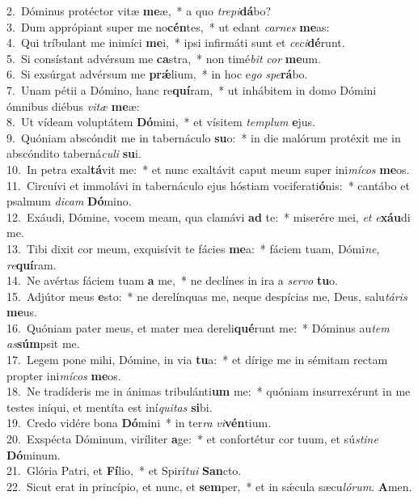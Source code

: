 {2.~}Dóminus protéctor vitæ \textbf{me}æ,~* a quo \textit{tre}\textit{pi}\textbf{dá}bo?\\
{3.~}Dum apprópiant super me no\textbf{cén}tes,~* ut edant \textit{car}\textit{nes} \textbf{me}as:\\
{4.~}Qui tríbulant me inimíci \textbf{me}i,~* ipsi infirmáti sunt et \textit{ce}\textit{ci}\textbf{dé}runt.\\
{5.~}Si consístant advérsum me \textbf{ca}stra,~* non timé\textit{bit} \textit{cor} \textbf{me}um.\\
{6.~}Si exsúrgat advérsum me \textbf{prǽ}lium,~* in hoc e\textit{go} \textit{spe}\textbf{rá}bo.\\
{7.~}Unam pétii a Dómino, hanc re\textbf{quí}ram,~* ut inhábitem in domo Dómini ómnibus diébus \textit{vi}\textit{tæ} \textbf{me}æ:\\
{8.~}Ut vídeam voluptátem \textbf{Dó}mini,~* et vísitem \textit{tem}\textit{plum} \textbf{e}jus.\\
{9.~}Quóniam abscóndit me in tabernáculo \textbf{su}o:~* in die malórum protéxit me in abscóndito taberná\textit{cu}\textit{li} \textbf{su}i.\\
{10.~}In petra exal\textbf{tá}vit me:~* et nunc exaltávit caput meum super ini\textit{mí}\textit{cos} \textbf{me}os.\\
{11.~}Circuívi et immolávi in tabernáculo ejus hóstiam vociferati\textbf{ó}nis:~* cantábo et psalmum \textit{di}\textit{cam} \textbf{Dó}mino.\\
{12.~}Exáudi, Dómine, vocem meam, qua clamávi \textbf{ad} te:~* miserére mei, \textit{et} \textit{e}\textbf{xáu}di me.\\
{13.~}Tibi dixit cor meum, exquisívit te fácies \textbf{me}a:~* fáciem tuam, Dómi\textit{ne}, \textit{re}\textbf{quí}ram.\\
{14.~}Ne avértas fáciem tuam \textbf{a} me,~* ne declínes in ira a \textit{ser}\textit{vo} \textbf{tu}o.\\
{15.~}Adjútor meus \textbf{e}sto:~* ne derelínquas me, neque despícias me, Deus, salu\textit{tá}\textit{ris} \textbf{me}us.\\
{16.~}Quóniam pater meus, et mater mea dereli\textbf{qué}runt me:~* Dóminus au\textit{tem} \textit{as}\textbf{súm}psit me.\\
{17.~}Legem pone mihi, Dómine, in via \textbf{tu}a:~* et dírige me in sémitam rectam propter ini\textit{mí}\textit{cos} \textbf{me}os.\\
{18.~}Ne tradíderis me in ánimas tribulánti\textbf{um} me:~* quóniam insurrexérunt in me testes iníqui, et mentíta est iní\textit{qui}\textit{tas} \textbf{si}bi.\\
{19.~}Credo vidére bona \textbf{Dó}mini~* in ter\textit{ra} \textit{vi}\textbf{vén}tium.\\
{20.~}Exspécta Dóminum, viríliter \textbf{a}ge:~* et confortétur cor tuum, et sú\textit{sti}\textit{ne} \textbf{Dó}minum.\\
{21.~}Glória Patri, et \textbf{Fí}lio,~* et Spirí\textit{tu}\textit{i} \textbf{San}cto.\\
{22.~}Sicut erat in princípio, et nunc, et \textbf{sem}per,~* et in sǽcula sæcu\textit{ló}\textit{rum}. \textbf{A}men.\\
